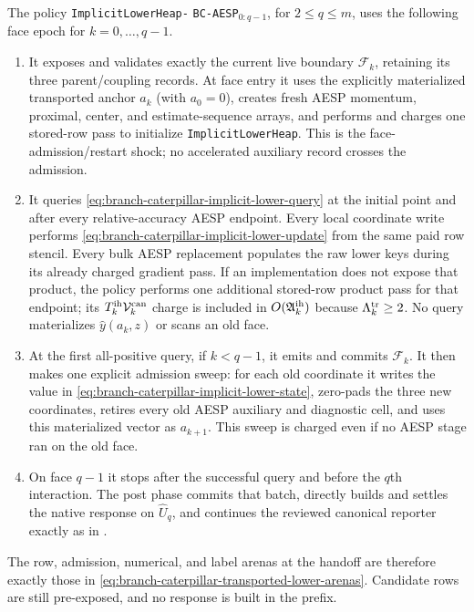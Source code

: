 \begin{definition}
\label{def:branch-caterpillar-implicit-lower-policy}
The policy
\texttt{ImplicitLowerHeap-}\allowbreak
\texttt{BC-AESP}$_{0:q-1}$, for $2\leq q\leq m$,
uses the following face epoch for $k=0,\ldots,q-1$.
\begin{enumerate}
 \item It exposes and validates exactly the current live boundary
       $\mathcal F_k$, retaining its three parent/coupling records.  At face
       entry it uses the explicitly materialized transported anchor $a_k$
       (with $a_0=0$), creates fresh
       AESP momentum, proximal, center, and estimate-sequence arrays, and
       performs and charges one stored-row pass to initialize
       \texttt{ImplicitLowerHeap}.  This is the face-admission/restart shock;
       no accelerated auxiliary record crosses the admission.
 \item It queries
       \cref{eq:branch-caterpillar-implicit-lower-query} at the initial point
       and after every relative-accuracy AESP endpoint.  Every local
       coordinate write performs
       \cref{eq:branch-caterpillar-implicit-lower-update} from the same paid
       row stencil.  Every bulk AESP replacement populates the raw lower
       keys during its already charged gradient pass.  If an implementation
       does not expose that product, the policy performs one additional
       stored-row product pass for that endpoint; its
       $T_k^{\rm ih}\mathcal V_k^{\rm can}$ charge is included in
       $O(\mathfrak A_k^{\rm ih})$ because $\Lambda_k^{\rm tr}\geq2$.
       No query materializes $\widehat y(a_k,z)$ or scans an old face.
 \item At the first all-positive query, if $k<q-1$, it emits and commits
       $\mathcal F_k$.  It then makes one explicit admission sweep: for each
       old coordinate it writes the value in
       \cref{eq:branch-caterpillar-implicit-lower-state}, zero-pads the three
       new coordinates, retires every old AESP auxiliary and diagnostic cell,
       and uses this materialized vector as $a_{k+1}$.  This sweep is charged
       even if no AESP stage ran on the old face.
 \item On face $q-1$ it stops after the successful query and before the
       $q$th interaction.  The post phase commits that batch, directly builds
       and settles the native response on $\widehat U_q$, and continues the
       reviewed canonical reporter exactly as in
       .
\end{enumerate}
The row, admission, numerical, and label arenas at the handoff are therefore
exactly those in
\cref{eq:branch-caterpillar-transported-lower-arenas}.  Candidate rows are
still pre-exposed, and no response is built in the prefix.
\end{definition}

